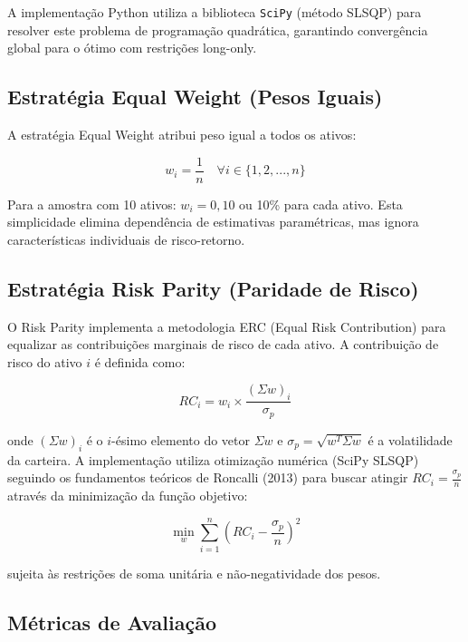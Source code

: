 A implementação Python utiliza a biblioteca \texttt{SciPy} (método SLSQP) para resolver este problema de programação quadrática, garantindo convergência global para o ótimo com restrições long-only.

\subsection{Estratégia Equal Weight (Pesos Iguais)}

A estratégia Equal Weight atribui peso igual a todos os ativos:

\begin{equation}
w_i = \frac{1}{n} \quad \forall i \in \{1, 2, ..., n\}
\end{equation}

Para a amostra com 10 ativos: $w_i = 0,10$ ou 10\% para cada ativo. Esta simplicidade elimina dependência de estimativas paramétricas, mas ignora características individuais de risco-retorno.

\subsection{Estratégia Risk Parity (Paridade de Risco)}

O Risk Parity implementa a metodologia ERC (Equal Risk Contribution) para equalizar as contribuições marginais de risco de cada ativo. A contribuição de risco do ativo $i$ é definida como:

\begin{equation}
RC_i = w_i \times \frac{(\Sigma w)_i}{\sigma_p}
\end{equation}

onde $(\Sigma w)_i$ é o $i$-ésimo elemento do vetor $\Sigma w$ e $\sigma_p = \sqrt{w^T \Sigma w}$ é a volatilidade da carteira. A implementação utiliza otimização numérica (SciPy SLSQP) seguindo os fundamentos teóricos de Roncalli (2013) para buscar atingir $RC_i = \frac{\sigma_p}{n}$ através da minimização da função objetivo:

\begin{equation}
\min_{w} \sum_{i=1}^{n} \left(RC_i - \frac{\sigma_p}{n}\right)^2
\end{equation}

sujeita às restrições de soma unitária e não-negatividade dos pesos.

\subsection{Métricas de Avaliação}


